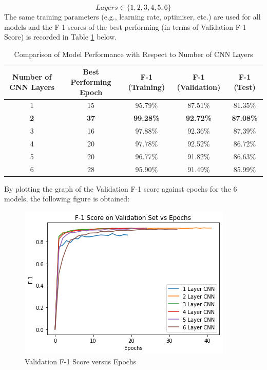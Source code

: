 \documentclass[sigconf,nonacm=true]{acmart}
\begin{document}
\begin{displaymath}
Layers \in \{1, 2, 3, 4, 5, 6\}
\end{displaymath}
The same training parameters (e.g., learning rate, optimiser, etc.) are used for all models and the F-1 scores of the best performing (in terms of Validation F-1 Score) is recorded in Table \ref{tab:cnnlayerscomparison} below.

\begin{table}[h]
	\begin{adjustbox}{width=\columnwidth}
		\begin{tabular}{ccccc}
			\toprule
			Number of CNN Layers&Best Performing Epoch&F-1 (Training)&F-1 (Validation)&F-1 (Test)\\
			\midrule
			1&15&95.79\%&87.51\%&81.35\%\\
			\textbf{2}&\textbf{37}&\textbf{99.28\%}&\textbf{92.72\%}&\textbf{87.08\%}\\		
			3&16&97.88\%&92.36\%&87.39\%\\
			4&20&97.78\%&92.52\%&86.72\%\\
			5&20&96.77\%&91.82\%&86.63\%\\
			6&28&95.90\%&91.49\%&85.99\%\\
			\bottomrule
		\end{tabular}
	\end{adjustbox}
	\caption{Comparison of Model Performance with Respect to Number of CNN Layers}
	\label{tab:cnnlayerscomparison}
\end{table}
By plotting the graph of the Validation F-1 score against epochs for the 6 models, the following figure is obtained:
\begin{figure}[H]
	\centering
	\includegraphics[scale=0.6]{figures/layerscomparison.png}
	\caption{Validation F-1 Score versus Epochs}
	\label{fig:layerscomparisonepoch}
\end{figure}
\end{document}
